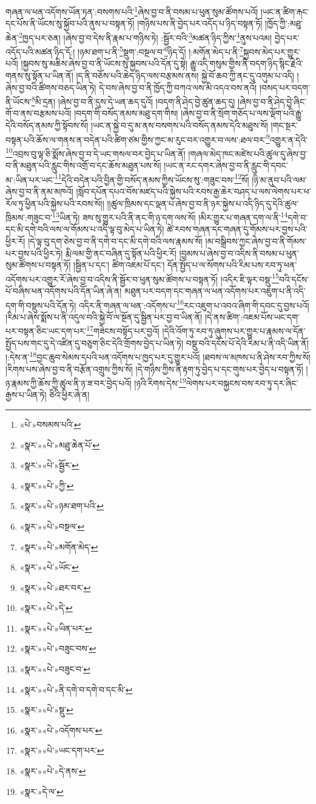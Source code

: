 གཞན་ལ་ཕན་འདོགས་ཡོན་ཏན་:བསགས་པའི་\footnote{«པེ་»བསམས་པའི་}ཞེས་བྱ་བ་ནི་བསམ་པ་ཕུན་སུམ་ཚོགས་པའོ། །ཡང་ན་ཚིག་རྐང་དང་པོས་ནི་ཡོངས་སུ་སྐྱོབ་པའི་ནུས་པ་བསྟན་ཏོ། །གཉིས་པས་ནི་བྱེད་པར་འདོད་པ་ཉིད་བསྟན་ཏོ། །ཁྱོད་ཀྱི་:མཐུ་ཆེན་\footnote{«སྣར་»«པེ་»མཐུ་ཆེན་པོ་}ཁྱད་པར་ཅན། །ཞེས་བྱ་བ་དེས་ནི་རྣམ་པ་གཉིས་ཏེ། :སྦྱོར་བའི་\footnote{«སྣར་»«པེ་»སྦྱོར་}མཚན་ཉིད་ཀྱིས་\footnote{«སྣར་»«པེ་»ཀྱི་}ནུས་པའམ། བྱེད་པར་འདོད་པའི་མཚན་ཉིད་དོ:། །ཉམ་ཐག་པ་ནི་\footnote{«སྣར་»«པེ་»ཉམ་ཐག་པའི་}སྡུག་:བསྔལ་བ་\footnote{«སྣར་»«པེ་»བསྔལ་}ཉིད་དོ། །:མགོན་མེད་པ་ནི་\footnote{«སྣར་»«པེ་»མགོན་མེད་}སྐྱབས་མེད་པར་གྱུར་པའོ། །སྐྱབས་སུ་མཆིས་ཞེས་བྱ་བ་ནི་ཡོངས་སུ་སྐྱབས་པའི་དོན་དུ་སྟེ། རྒྱུ་འདི་གསུམ་གྱིས་ནི་བདག་ཉིད་སྙིང་རྗེའི་གནས་སུ་སྟོན་པ་ཡིན་ནོ། །ད་ནི་བཅོས་པའི་ཆེད་ཉིད་ལས་བརྩམས་ནས། སྐྱེ་བོ་ཆབ་ཀྱི་ནང་དུ་འགུམ་པ་འདི། །ཞེས་བྱ་བའི་ཚིགས་བཅད་ཡིན་ཏེ། དེ་བས་ཞེས་བྱ་བ་ནི་ཁྱོད་ཀྱི་བཀའ་ལས་མི་འདའ་བས་ནའོ། །བསད་པར་བདག་ནི་ཡོངས་\footnote{«སྣར་»«པེ་»ཡོང་}མི་དྲན། །ཞེས་བྱ་བ་ནི་དུས་དེ་ཡན་ཆད་དུའོ། །བདག་ནི་ཤེད་བྱེ་ཚུན་ཆད་དུ། །ཞེས་བྱ་བ་ནི་ཤེད་བྱེ་ཞིང་གོ་བ་ནས་བརྩམས་པའོ། །བདག་གི་བསོད་ནམས་མཐུ་དག་གིས། །ཞེས་བྱ་བ་ནི་སྲོག་གཅོད་པ་ལས་ལྡོག་པའི་རྒྱུ་དེའི་བསོད་ནམས་ཀྱི་སྟོབས་སོ། །ཡང་ན་སྐྱེ་བ་དུ་མ་ནས་བསགས་པའི་བསོད་ནམས་དེའི་མཐུས་སོ། །གང་སྔར་བསྟན་པའི་ཆོས་ལ་གནས་ན་བདེན་པའི་ཚིག་ཙམ་གྱིས་ཀྱང་མ་རུང་བར་འགྱུར་བ་ལས་:ཐལ་བར་\footnote{«སྣར་»«པེ་»ཐར་བར་}འགྱུར་ན་དེའི་\footnote{«སྣར་»«པེ་»དེ་}འབྲས་བུ་ལྟ་ཅི་སྨོས་ཞེས་བྱ་བ་དེ་ཡང་གསལ་བར་བྱེད་པ་ཡིན་ནོ། །གཞལ་མེད་ཁང་མཛེས་པའི་ཚུལ་དུ་ཞེས་བྱ་བ་ནི་མཐུན་པའི་རླུང་གིས་འགྲོ་བ་དང་ཆོས་མཐུན་པས་སོ། །ཡང་ན་རང་དགར་ཞེས་བྱ་བ་ནི་རླུང་གི་དབང་མ་:ཡིན་པར་ཡང་\footnote{«སྣར་»«པེ་»ཡིན་པར་}དེའི་བདེན་པའི་བྱིན་གྱི་བསོད་ནམས་ཀྱིས་ཡོངས་སུ་:གཟུང་བས་\footnote{«སྣར་»«པེ་»བཟུང་བས་}སོ། །ཉི་མ་ནུབ་པའི་ལམ་ཞེས་བྱ་བ་ནི་ནམ་མཁའོ། །སློབ་དཔོན་དཔའ་བོས་མཛད་པའི་སྐྱེས་པའི་རབས་རྒྱ་ཆེར་བཤད་པ་ལས་ལེགས་པར་ཕ་རོལ་ཏུ་ཕྱིན་པའི་སྐྱེས་པའི་རབས་སོ།། །།ཚུལ་ཁྲིམས་དང་ལྡན་པ་ཞེས་བྱ་བ་ནི་ཉར་སྐྱེས་པ་འདི་ཉིད་དུ་དེའི་ཚུལ་ཁྲིམས་:གཟུང་བ་\footnote{«སྣར་»«པེ་»བཟུང་བ་}ཡིན་ཏེ། ཟས་སུ་གྱུར་པའི་ནི་ནང་གི་ཉ་དག་ལས་སོ། །མིར་གྱུར་པ་གཞན་དག་ལ་ནི་\footnote{«སྣར་»«པེ་»ནི་དགེ་བ་དགེ་བ་དང་མི་}དགེ་བ་དང་མི་དགེ་བའི་ལས་ལ་གོམས་པ་འདི་ལྟ་བུ་མེད་པ་ཡིན་ཏེ། ཚེ་རབས་གཞན་དང་གཞན་དུ་གོམས་པར་བྱས་པའི་ཕྱིར་རོ། །དེ་ལྟ་བུ་དག་ཅེས་བྱ་བ་ནི་དགེ་བ་དང་མི་དགེ་བའི་ལས་རྣམས་སོ། །མ་བསྒྲིབས་ཀྱང་ཞེས་བྱ་བ་ནི་གོམས་པར་བྱས་པའི་ཕྱིར་ཏེ། རྨི་ལམ་གྱི་ནང་བཞིན་དུ་སྟོན་པའི་ཕྱིར་རོ། །བྱམས་པ་ཞེས་བྱ་བ་འདིས་ནི་བསམ་པ་ཕུན་སུམ་ཚོགས་པ་བསྟན་ཏོ། །སྦྱིན་པ་དང་། ཚིག་འཇམ་པོ་དང་། དོན་སྤྱོད་པ་ལ་སོགས་པའི་རིམ་པས་རབ་ཏུ་ཕན་འདོགས་པར་འགྱུར་རོ་ཞེས་བྱ་བ་འདིས་ནི་སྦྱོར་བ་ཕུན་སུམ་ཚོགས་པ་བསྟན་ཏོ། །འདིར་ཇི་ལྟར་བསྡུ་\footnote{«སྣར་»«པེ་»སྡུ་}བའི་དངོས་པོ་བཞིས་ཕན་འདོགས་པའི་དོན་ཡིན་ཞེ་ན། མཐུན་པར་བདག་དང་གཞན་ལ་ཕན་འདོགས་པར་འཇུག་པ་ནི་འདི་དག་གི་བསྡུས་པའི་དོན་ཏེ། འདིར་ནི་གཞན་ལ་ཕན་:འདོགས་པ་\footnote{«སྣར་»«པེ་»འདོགས་པར་}རང་འཇུག་པ་འབའ་ཞིག་གི་དབང་དུ་བྱས་པའོ། །རིམ་པ་ཞེས་སྨོས་པ་ནི་འདུལ་བའི་སྐྱེ་བོ་ལ་སྔོན་དུ་སྦྱིན་པར་བྱ་བ་ཡིན་ནོ། །དེ་ནས་ཚིག་:འཇམ་པོས་ཡང་དག་པར་བསྟན་ཅིང་ཡང་དག་པར་\footnote{«སྣར་»«པེ་»ཡང་དག་པར་}གཟེངས་བསྟོད་པར་བྱའོ། །དེའི་འོག་ཏུ་རབ་ཏུ་ཞུགས་པར་གྱུར་པ་རྣམས་ལ་དོན་སྤྱོད་པས་གང་དུ་དེ་འཛིན་དུ་བཅུག་ཅིང་དེའི་གྲོགས་བྱེད་པ་ཡིན་ཏེ། བསྡུ་བའི་དངོས་པོ་དེའི་རིམ་པ་ནི་འདི་ཡིན་ནོ། །:དེས་ན་\footnote{«སྣར་»«པེ་»དེ་ནས་}བྱང་ཆུབ་སེམས་དཔའི་ཕན་འདོགས་པ་ཁྱད་པར་དུ་གྱུར་པའོ། །ཐབས་ལ་མཁས་པ་ནི་ཤེས་རབ་ཀྱིས་སོ། །རིགས་པས་ཞེས་བྱ་བ་ནི་བརྩོན་འགྲུས་ཀྱིས་སོ། །དེ་གཉིས་ཀྱིས་ནི་རྟག་ཏུ་བྱེད་པ་དང་གུས་པར་བྱེད་པ་བསྟན་ཏོ། །ཉ་རྣམས་ཀྱི་ཆོས་ཀྱི་ཚུལ་ནི་ཉ་ཟ་བར་བྱེད་པའོ། །ཉའི་རིགས་དེས་\footnote{«སྣར་»དེ་ལ་}ལེགས་པར་བསྐྱངས་བས་རབ་ཏུ་དར་ཞིང་རྒྱས་པ་ཡིན་ཏེ། ཅིའི་ཕྱིར་ཞེ་ན། 
